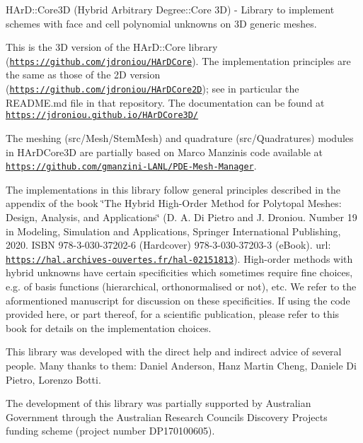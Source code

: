 H\+Ar\+D\+::\+Core3D (Hybrid Arbitrary Degree\+::\+Core 3D) -\/ Library to implement schemes with face and cell polynomial unknowns on 3D generic meshes.

This is the 3D version of the H\+Ar\+D\+::\+Core library (\href{https://github.com/jdroniou/HArDCore}{\tt https\+://github.\+com/jdroniou/\+H\+Ar\+D\+Core}). The implementation principles are the same as those of the 2D version (\href{https://github.com/jdroniou/HArDCore2D}{\tt https\+://github.\+com/jdroniou/\+H\+Ar\+D\+Core2D}); see in particular the R\+E\+A\+D\+M\+E.\+md file in that repository. The documentation can be found at \href{https://jdroniou.github.io/HArDCore3D/}{\tt https\+://jdroniou.\+github.\+io/\+H\+Ar\+D\+Core3\+D/}

The meshing (src/\+Mesh/\+Stem\+Mesh) and quadrature (src/\+Quadratures) modules in H\+Ar\+D\+Core3D are partially based on Marco Manzini\textquotesingle{}s code available at \href{https://github.com/gmanzini-LANL/PDE-Mesh-Manager}{\tt https\+://github.\+com/gmanzini-\/\+L\+A\+N\+L/\+P\+D\+E-\/\+Mesh-\/\+Manager}.

The implementations in this library follow general principles described in the appendix of the book \char`\"{}\+The Hybrid High-\/\+Order Method for Polytopal Meshes\+: Design, Analysis, and Applications\char`\"{} (D. A. Di Pietro and J. Droniou. Number 19 in Modeling, Simulation and Applications, Springer International Publishing, 2020. I\+S\+BN 978-\/3-\/030-\/37202-\/6 (Hardcover) 978-\/3-\/030-\/37203-\/3 (e\+Book). url\+: \href{https://hal.archives-ouvertes.fr/hal-02151813}{\tt https\+://hal.\+archives-\/ouvertes.\+fr/hal-\/02151813}). High-\/order methods with hybrid unknowns have certain specificities which sometimes require fine choices, e.\+g. of basis functions (hierarchical, orthonormalised or not), etc. We refer to the aformentioned manuscript for discussion on these specificities. If using the code provided here, or part thereof, for a scientific publication, please refer to this book for details on the implementation choices.

This library was developed with the direct help and indirect advice of several people. Many thanks to them\+: Daniel Anderson, Hanz Martin Cheng, Daniele Di Pietro, Lorenzo Botti.

The development of this library was partially supported by Australian Government through the Australian Research Council\textquotesingle{}s Discovery Projects funding scheme (project number D\+P170100605). 
